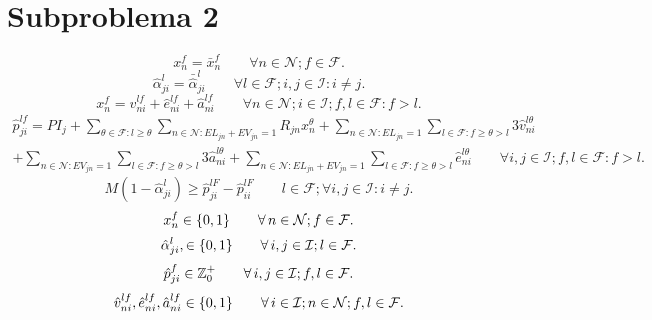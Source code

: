 \documentclass[authoryear,preprint,review,12pt]{elsarticle}
\begin{document}
\section{Subproblema 2}
\begin{equation}\label{x_sp2}
x_n^f= \bar{x}_n^f \qquad \forall n \in \mathcal{N}; f \in \mathcal{F}.
\end{equation}
\begin{equation}\label{alpha-sp2}
\hat{\alpha}_{ji}^l = \bar{\hat{\alpha}}_{ji}^l \qquad \forall l \in \mathcal{F}; i,j \in \mathcal{I}: i \neq j.
\end{equation}
\begin{equation}\label{ecua8}
  x_n^f = \hat{v}_{ni}^{lf} + \hat{e}_{ni}^{lf} + \hat{a}_{ni}^{lf} \qquad \forall n \in \mathcal{N}; i \in \mathcal{I}; f,l \in \mathcal{F}: f > l.
\end{equation}
\begin{multline}\label{ecua10}
  \hat{p}_{ji}^{lf} = PI_j + \sum_{\theta \in  \mathcal{F}: l \geq \theta}\sum\limits_{n \in \mathcal{N}: EL_{jn}+EV_{jn}=1}R_{jn}x_n^\theta + \sum\limits_{n \in \mathcal{N}: EL_{jn}=1}\sum\limits_{l \in \mathcal{F}: f \geq \theta > l}3\hat{v}_{ni}^{l\theta} \\
  + \sum\limits_{n \in \mathcal{N}: EV_{jn}=1}\sum\limits_{l \in \mathcal{F}: f \geq \theta > l}3\hat{a}_{ni}^{l\theta} + \sum\limits_{n \in \mathcal{N}: EL_{jn}+ EV_{jn}=1}\sum\limits_{l \in \mathcal{F}: f \geq \theta > l}\hat{e}_{ni}^{l\theta} \qquad \forall i,j \in \mathcal{I}; f,l \in \mathcal{F}: f > l.
\end{multline}
\begin{equation}\label{ecua12a}
   M(1-\hat{\alpha}_{ji}^l) \geq \hat{p}_{ji}^{lF} - \hat{p}_{ii}^{lF} \qquad l \in \mathcal{F}; \forall i,j \in \mathcal{I}: i \neq j.
\end{equation}
\begin{equation}\label{ecua29_sp2}
  x_n^f \in\{0,1\} \qquad \forall\, n \in \mathcal{N}; f \in \mathcal{F}.\\
\end{equation}
\begin{equation}\label{ecua33_sp2}
  \hat{\alpha}_{ji}^l, \in \{0,1\} \qquad \forall\, i,j \in \mathcal{I}; l \in \mathcal{F}.\\
\end{equation}
\begin{equation}\label{ecua31_sp2}
  \hat{p}_{ji}^{f} \in \mathbb{Z}^+_0 \qquad \forall\, i,j \in \mathcal{I}; f,l \in \mathcal{F}.\\
\end{equation}
\begin{equation}\label{ecua32a}
  \hat{v}_{ni}^{lf},  \hat{e}_{ni}^{lf}, \hat{a}_{ni}^{lf} \in \{0,1\} \qquad \forall\, i \in \mathcal{I}; n \in \mathcal{N}; f,l \in \mathcal{F}.\\
\end{equation}
\end{document}
